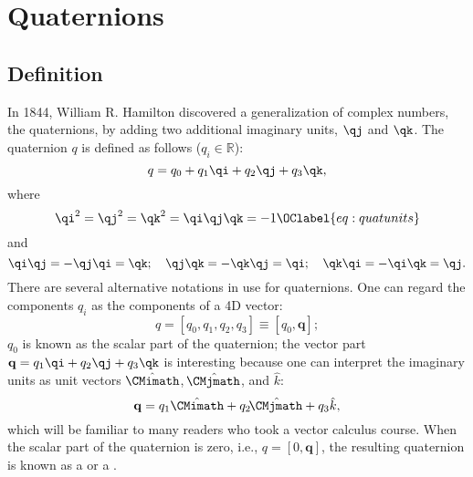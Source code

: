 \section{Quaternions}

\subsection{Definition}
In 1844, William R. Hamilton \cite{hamilton1844a} discovered a generalization of complex numbers, the quaternions, by adding two additional imaginary units, $\qj$ and $\qk$.  The quaternion $q$ is defined as follows ($q_i\in\mathbb{R}$):
\begin{equation}
	q = q_0 + q_1\qi+q_2\qj+q_3\qk,
\end{equation}
where
\begin{equation}
	\qi^2=\qj^2=\qk^2=\qi\qj\qk=-1\OClabel{eq:quatunits}
\end{equation}
and
\begin{equation}
	\qi\qj=-\qj\qi=\qk;\quad \qj\qk=-\qk\qj=\qi;\quad \qk\qi=-\qi\qk=\qj.
\end{equation}
There are several alternative notations in use for quaternions. One can regard the components $q_i$ as the components of a 4D vector:
\begin{equation}
	q = \left[ q_0, q_1, q_2, q_3\right] \equiv \left[q_0,\mathbf{q}\right];
\end{equation}
$q_0$ is known as the scalar part  of the quaternion; the vector part $\mathbf{q}=q_1\qi+q_2\qj+q_3\qk$ is interesting because one can interpret the imaginary units as unit vectors $\hat{\CMimath}$, $\hat{\mkern-3mu\CMjmath}$, and $\hat{k}$:
\begin{equation}
	\mathbf{q} = q_1\hat{\CMimath}+q_2\hat{\mkern-3mu\CMjmath}+q_3\hat{k},
\end{equation}
which will be familiar to many readers who took a vector calculus course.  When the scalar part of the quaternion is zero, i.e., $q=[0,\mathbf{q}]$, the resulting quaternion is known as a  or a .

